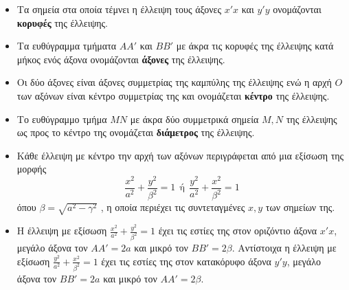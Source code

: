 \begin{itemize}
\item Τα σημεία στα οποία τέμνει η έλλειψη τους άξονες $ x'x $ και $ y'y $ ονομάζονται \textbf{κορυφές} της έλλειψης.
\item Τα ευθύγραμμα τμήματα $ AA' $ και $ BB' $ με άκρα τις κορυφές της έλλειψης κατά μήκος ενός άξονα ονομάζονται \textbf{άξονες} της έλλειψης.
\item Οι δύο άξονες είναι άξονες συμμετρίας της καμπύλης της έλλειψης ενώ η αρχή $ O $ των αξόνων είναι κέντρο συμμετρίας της και ονομάζεται \textbf{κέντρο} της έλλειψης.
\item Tο ευθύγραμμο τμήμα $ MN $ με άκρα δύο συμμετρικά σημεία $ M,N $ της έλλειψης ως προς το κέντρο της ονομάζεται \textbf{διάμετρος} της έλλειψης.
\item Κάθε έλλειψη με κέντρο την αρχή των αξόνων περιγράφεται από μια εξίσωση της μορφής \[ \frac{x^2}{a^2}+\frac{y^2}{\beta^2}=1\ \ \textrm{ή}\ \  \frac{y^2}{a^2}+\frac{x^2}{\beta^2}=1\] όπου $ \beta=\sqrt{a^2-\gamma^2} $ , η οποία περιέχει τις συντεταγμένες $ x,y $ των σημείων της.
\item Η έλλειψη με εξίσωση $\frac{x^2}{a^2}+\frac{y^2}{\beta^2}=1$ έχει τις εστίες της στον οριζόντιο άξονα $ x'x $, μεγάλο άξονα τον $ AA'=2a $ και μικρό τον $ BB'=2\beta $. Αντίστοιχα η έλλειψη με εξίσωση $\frac{y^2}{a^2}+\frac{x^2}{\beta^2}=1$ έχει τις εστίες της στον κατακόρυφο άξονα $ y'y $, μεγάλο άξονα τον $ BB'=2a $ και μικρό τον $ AA'=2\beta $.
\end{itemize}
